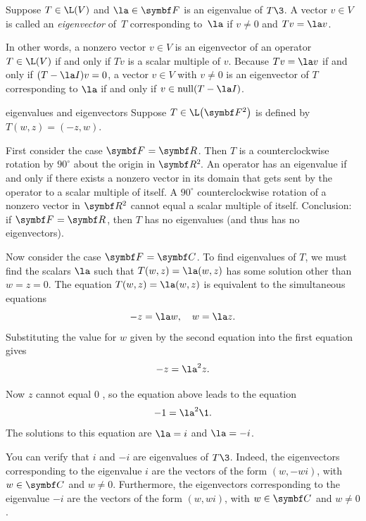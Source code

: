 {Suppose $T \in \L(V)$ and $\la \in \F{}$ is an eigenvalue of $T\3$.
A vector $v \in V$ is called an \emph{eigenvector} of~$T$ corresponding
to~$\la$ if $v \ne 0$ and $Tv = \la v$.}

In other words, a nonzero vector $v \in V$ is an eigenvector of an operator $T \in \L(V)$ if and only if $Tv$ is a scalar multiple of $v$.
Because $Tv = \la v$ if and only if $(T - \la I)v = 0$, a vector $v \in V$ with $v \ne 0$ is an eigenvector of $T$ corresponding to $\la$ if and only if $v \in \ker (T - \la I)$.

\begin{example}[a117]{eigenvalues and eigenvectors}
Suppose $T \in \L\paren[\big]{\F{2}}$ is defined by
$ %
T(w,z) = (-z,w)$.
\begin{subtheorem}
\item
First consider the case $\F{} = \R{}$. Then $T$ is a counterclockwise rotation by $90^\circ$ about the origin in $\RR{2}$.
An operator has an eigenvalue if and only if there exists a nonzero vector in its domain that gets sent by the operator to a scalar multiple of itself.  A $90^\circ$ counterclockwise rotation of a nonzero vector in $\R{2}$ cannot equal a scalar multiple of itself.  Conclusion: if $\F{} = \R{}$, then $T$ has no eigenvalues (and thus has no eigenvectors).

\item
Now consider the case $\F{} = \C{}$. To find eigenvalues of $T$, we must
find the scalars $\la$ such that
$
T(w,z) = \la (w, z)$
has some solution other than $w = z = 0$.  The
equation $T(w,z) = \la (w, z)$ is equivalent to the simultaneous equations
\begin{equation}%
-z = \la w, \quad w = \la z. \label{118}
\end{equation}%
Substituting the value for $w$ given by the second equation into the first
equation gives
\[
-z = \la^2 z.
\]

\pagebreak[3]

Now $z$ cannot equal $0$ , so the
equation above leads to the equation
\[
-1 = \la^2\1.
\]
The solutions to this equation are $\la = i$ and $\la = -i$.

You can verify that $i$ and $-i$ are eigenvalues of $T\3$.  Indeed, the eigenvectors
corresponding to the eigenvalue $i$ are the vectors of the form $(w, -wi)$, with
$w \in \C{}$ and $w \ne 0$. Furthermore, the eigenvectors corresponding to the eigenvalue $-i$ are the
vectors of the form $(w, wi)$, with $w \in \C{}$ and $w \ne 0$.
\end{subtheorem}
\exampleitemend
\end{example}


